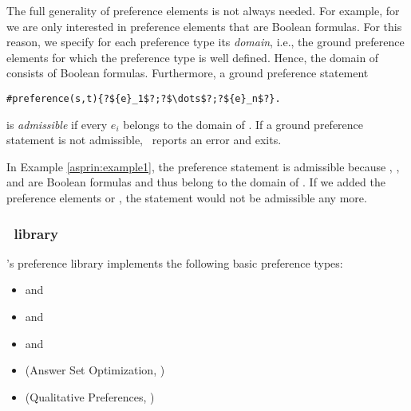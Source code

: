 The full generality of preference elements is not always needed.
For example, for  we are only interested in preference elements that are Boolean formulas.
For this reason, we specify for each preference type its \emph{domain}, 
i.e., the ground preference elements for which the preference type is well defined.
Hence, the domain of  consists of Boolean formulas.
Furthermore, a ground preference statement
\begin{lstlisting}[numbers=none,escapechar=?]
#preference(s,t){?${e}_1$?;?$\dots$?;?${e}_n$?}.
\end{lstlisting}
is \emph{admissible} if every ${e}_i$ belongs to the domain of .
If a ground preference statement is not admissible, \asprin\ reports an error and exits. 
\begin{example}
In Example \ref{asprin:example1}, the preference statement   
is admissible because , , and  are Boolean formulas
and thus belong to the domain of . 
If we added the preference elements  or , 
the statement would not be admissible any more.
\end{example}

\subsubsection{\asprin\ library}

\asprin's preference library implements the following basic preference types:
\begin{itemize}
	\item  {} and    
	\item  {} and    
	\item  {} and    
	\item  {}   (Answer Set Optimization, \cite{brnitr03a})   
	\item  {} (Qualitative Preferences, \cite{rogima10a})  
\end{itemize}


